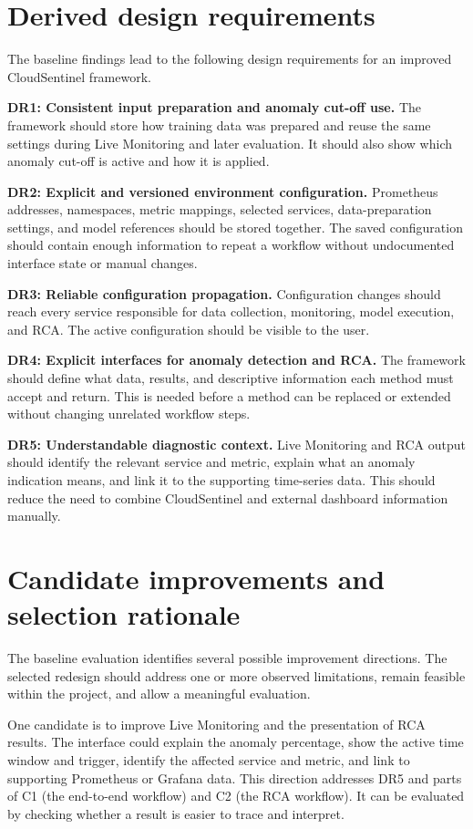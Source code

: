 \section{Derived design requirements}
The baseline findings lead to the following design requirements for an improved CloudSentinel framework.

\textbf{DR1: Consistent input preparation and anomaly cut-off use.}
The framework should store how training data was prepared and reuse the same settings during Live Monitoring and later evaluation. It should also show which anomaly cut-off is active and how it is applied.

\textbf{DR2: Explicit and versioned environment configuration.} Prometheus addresses, namespaces, metric mappings, selected services, data-preparation settings, and model references should be stored together. The saved configuration should contain enough information to repeat a workflow without undocumented interface state or manual changes.

\textbf{DR3: Reliable configuration propagation.} Configuration changes should reach every service responsible for data collection, monitoring, model execution, and RCA. The active configuration should be visible to the user.

\textbf{DR4: Explicit interfaces for anomaly detection and RCA.} The framework should define what data, results, and descriptive information each method must accept and return. This is needed before a method can be replaced or extended without changing unrelated workflow steps.

\textbf{DR5: Understandable diagnostic context.} Live Monitoring and RCA output should identify the relevant service and metric, explain what an anomaly indication means, and link it to the supporting time-series data. This should reduce the need to combine CloudSentinel and external dashboard information manually.

\section{Candidate improvements and selection rationale}
The baseline evaluation identifies several possible improvement directions. The selected redesign should address one or more observed limitations, remain feasible within the project, and allow a meaningful evaluation.

One candidate is to improve Live Monitoring and the presentation of RCA results. The interface could explain the anomaly percentage, show the active time window and trigger, identify the affected service and metric, and link to supporting Prometheus or Grafana data. This direction addresses DR5 and parts of C1 (the end-to-end workflow) and C2 (the RCA workflow). It can be evaluated by checking whether a result is easier to trace and interpret.

